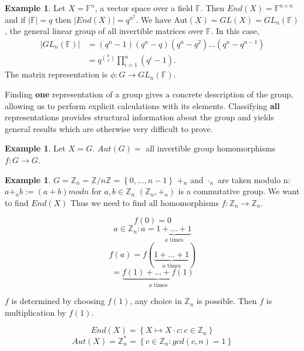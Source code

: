 \documentclass[12pt]{amsart}
\theoremstyle{definition}
\newtheorem{example}[theorem]{Example}
\begin{document}
\begin{example}
Let $X=\mathbb{F}^n$, a vector space over a field $\mathbb{F}$.  Then $End(X)=\mathbb{F}^{n\times n}$ and if $|\mathbb{F}|=q$ then $|End(X)|=q^{n^2}$.  We have Aut$(X)=GL(X)=GL_n(\mathbb{F})$, the general linear group of all invertible matrices over $\mathbb{F}$.  In this case,
\begin{align*}
|GL_n(\mathbb{F})| &= (q^n-1)(q^n-q)(q^n-q^2)\ldots(q^n-q^{n-1})\\
&= q^{n\choose 2}\prod_{i=1}^n(q^i-1).
\end{align*}
The matrix representation is $\phi:G\rightarrow GL_n(\mathbb{F})$.
\end{example}

Finding \textbf{one} representation of a group gives a concrete description of the group, allowing us to perform explicit calculations with its elements.  Classifying \textbf{all} representations provides structural information about the group and yields general results which are otherwise very difficult to prove.

\begin{example}
Let $X = G$. $Aut(G) =$ all invertible group homomorphisms $f: G \rightarrow G$.
\end{example}

\begin{example}
$G = \mathbb{Z}_{n} = \mathbb{Z} / n \mathbb{Z} = \left\{ 0, \ldots , n - 1 \right\}$
$+_{n}$ and $\cdot_{n}$ are taken modulo n:
$a +_{n} b := ( a + b ) mod n$ for $a, b \in \mathbb{Z}_{n}$
$\left( \mathbb{Z}_{n}, +_{n} \right)$ is a commutative group. We want to find
$End(X)$
Thus we need to find all homomorphisms $f: \mathbb{Z}_{n} \rightarrow \mathbb{Z}_{n}$.


$$f(0) = 0$$
$$a \in \mathbb{Z}_{n} : a = \underbrace{1 + \ldots + 1}_{a \text{ times}}$$
$$f(a) = f( \underbrace{1 + \ldots + 1}_{a \text{ times}})$$
$$ = \underbrace{f(1) + \ldots + f(1)}_{a \text{ times}}$$

$f$ is determined by choosing $f(1)$, any choice in $\mathbb{Z}_{n}$ is possible. Then $f$ is multiplication by $f(1)$.

$$End(X) = \left\{ X \mapsto X \cdot c : c \in \mathbb{Z}_{n} \right\}$$
$$Aut(X) = \mathbb{Z}_{n}^{\ast} = \left\{ c \in \mathbb{Z}_{n} : gcd ( c, n ) = 1 \right\}$$
\end{example}
\end{document}
